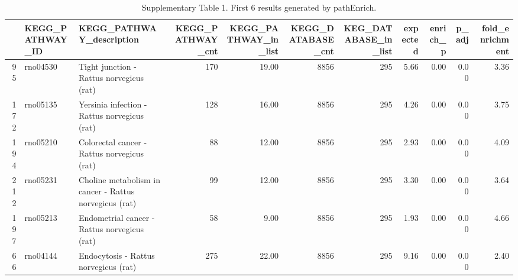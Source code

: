 \documentclass[article]{jss}\usepackage[]{graphicx}\usepackage[]{color}
\begin{document}
\begin{table}[h]
  \centering
  \caption{Supplementary Table 1. First 6 results generated by pathEnrich.}
  \tiny
  \begin{adjustbox}{width=\textwidth}
  \begin{tabular}{rllrrrrrrrr}
  \hline
 & KEGG\_PATHWAY\_ID & KEGG\_PATHWAY\_description & KEGG\_PATHWAY\_cnt & KEGG\_PATHWAY\_in\_list & KEGG\_DATABASE\_cnt & KEG\_DATABASE\_in\_list & expected & enrich\_p & p\_adj & fold\_enrichment \\
  \hline
95 & rno04530 & Tight junction - Rattus norvegicus (rat) & 170 & 19.00 & 8856 & 295 & 5.66 & 0.00 & 0.00 & 3.36 \\
  172 & rno05135 & Yersinia infection - Rattus norvegicus (rat) & 128 & 16.00 & 8856 & 295 & 4.26 & 0.00 & 0.00 & 3.75 \\
  194 & rno05210 & Colorectal cancer - Rattus norvegicus (rat) &  88 & 12.00 & 8856 & 295 & 2.93 & 0.00 & 0.00 & 4.09 \\
  212 & rno05231 & Choline metabolism in cancer - Rattus norvegicus (rat) &  99 & 12.00 & 8856 & 295 & 3.30 & 0.00 & 0.00 & 3.64 \\
  197 & rno05213 & Endometrial cancer - Rattus norvegicus (rat) &  58 & 9.00 & 8856 & 295 & 1.93 & 0.00 & 0.00 & 4.66 \\
  66 & rno04144 & Endocytosis - Rattus norvegicus (rat) & 275 & 22.00 & 8856 & 295 & 9.16 & 0.00 & 0.00 & 2.40 \\
   \hline
  \end{tabular}
\end{adjustbox}
\end{table}







\end{document}
